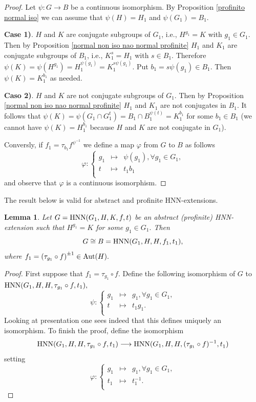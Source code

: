 \documentclass[a4paper,12pt]{article}
\newtheorem{lem}[thm]{Lemma}
\def\aut {{\rm Aut}}
\def\hnn {{\rm HNN}}
\begin{document}
{\begin{proof} Let $\psi: G\rightarrow  B$ be a  continuous isomorphism. By Proposition \ref{profinito normal iso} we can assume that $\psi(H) = H_1$ and $\psi(G_1) =B_{1}.$ 

\textbf{Case 1)}.  $H$ and $K$ are conjugate subgroups of $G_1$, i.e.,  $H^{g_1}=K$ with $g_1\in G_1$. Then by  Proposition \ref{normal non iso nao normal profinite}  $H_1$ and $K_1$ are conjugate subgroups of $B_1$, i.e.,  $K_1^{s}=H_1$ with $s\in B_1$. Therefore $\psi(K)=\psi(H^{g_1})=H_1^{\psi(g_1)}=K_1^{s\psi(g_1)}$. Put $b_1=s\psi(g_1) \in B_1$. Then $\psi(K)=K_1^{b_1}$ as needed.

\textbf{Caso 2)}.  $H$ and $K$ are not conjugate subgroups of $G_1$. Then by Proposition \ref{normal non iso nao normal profinite} $H_1$ and $K_1$ are not conjugates in $B_1$. It follows that
 $\psi(K) =\psi(G_1\cap G_1^{t})= B_1 \cap  B_1^{\psi(t)} =K_1^{b_1}$ for some $b_1\in B_1$  (we cannot have $\psi(K) = H_{1}^{ b_1}$ because  $H$ and $K$ are not conjugate in $G_1$).

\bigskip
Conversly, if $f_1=\tau_{b_1}f^{\psi^{-1}}$ we define a map $\varphi$  from $G$ to $B$ as follows $$\varphi: \left\{
\begin{array}{ccl}
g_1 & \longmapsto  & \psi(g_1), \forall  g_1 \in  G_1,\\
t & \longmapsto  & t_1 b_1\\
\end{array}
\right.$$ and observe that $\varphi$ is a continuous isomorphism.
\end{proof}

The result below is valid for abstract and profinite HNN-extensions.  

\begin{lem} \label{conjugados da normal} Let $G=\hnn(G_1, H, K, f, t)$ be an  abstract (profinite) HNN-extension such that $H^{g_1}=K$ for some $g_1 \in G_1.$ Then $$G \cong B=\hnn(G_1, H, H, f_1, t_1),$$  where $f_1=\left( \tau_{g_1} \circ f \right)^{\pm 1} \in \aut(H).$
\end{lem}

\begin{proof} First suppose that $f_1=\tau_{g_1} \circ f.$ Define the following isomorphism of $G$ to $\hnn(G_1, H, H, \tau_{g_1} \circ f, t_1),$  
 $$\psi: \left\{
\begin{array}{ccl}
g_1 & \longmapsto  & g_1, \forall  g_1 \in  G_1,\\
t & \longmapsto  & t_1 g_1.\\
\end{array}
\right.$$ Looking at presentation one sees indeed that this defines uniquely an isomorphism. To finish the proof, define the  isomorphism  $$\hnn(G_1, H, H, \tau_{g_1} \circ f, t_1)\longrightarrow \hnn(G_1, H, H, (\tau_{g_1} \circ f)^{-1}, t_{1}^{})$$   setting
 $$\varphi: \left\{
\begin{array}{ccl}
g_1 & \longmapsto  & g_1, \forall  g_1 \in  G_1,\\
t_1 & \longmapsto  & t_1^{-1}.\\
\end{array}
\right.$$ 
\end{proof}


}
\end{document}
